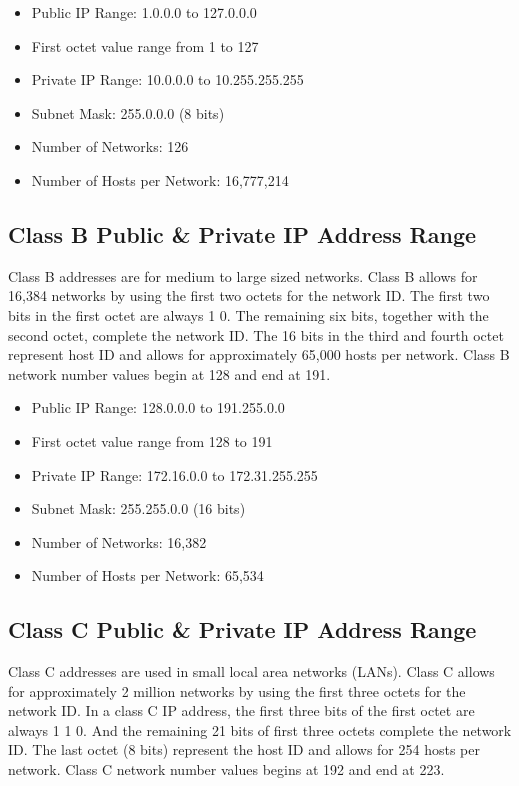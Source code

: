 \documentclass[a4paper,12pt]{article}
\begin{document}
\begin{itemize}
\item{Public IP Range: 1.0.0.0 to 127.0.0.0}
\item{First octet value range from 1 to 127}
\item{Private IP Range: 10.0.0.0 to 10.255.255.255}
\item{Subnet Mask: 255.0.0.0 (8 bits)}
\item{Number of Networks: 126}
\item{Number of Hosts per Network: 16,777,214}
\end{itemize}
 \clearpage
\subsection{Class B Public & Private IP Address Range}
Class B addresses are for medium to large sized networks. Class B allows for 16,384 networks by using the first two octets for the network ID. The first two bits in the first octet are always 1 0. The remaining six bits, together with the second octet, complete the network ID. The 16 bits in the third and fourth octet represent host ID and allows for approximately 65,000 hosts per network. Class B network number values begin at 128 and end at 191.

\begin{itemize}
\item{Public IP Range: 128.0.0.0 to 191.255.0.0}
\item{First octet value range from 128 to 191}
\item{Private IP Range: 172.16.0.0 to 172.31.255.255}
\item{Subnet Mask: 255.255.0.0 (16 bits)}
\item{Number of Networks: 16,382}
\item{Number of Hosts per Network: 65,534}
\end{itemize}

\subsection{Class C Public & Private IP Address Range}
Class C addresses are used in small local area networks (LANs). Class C allows for approximately 2 million networks by using the first three octets for the network ID. In a class C IP address, the first three bits of the first octet are always 1 1 0. And the remaining 21 bits of first three octets complete the network ID. The last octet (8 bits) represent the host ID and allows for 254 hosts per network. Class C network number values begins at 192 and end at 223.
\end{document}
